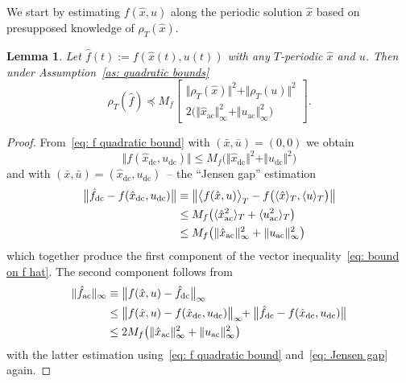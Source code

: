 \documentclass[letterpaper, 10 pt, conference]{ieeeconf}
\newcommand{\mmax}{_\mathrm{max}}
\newcommand{\ac}{_\mathrm{ac}}
\newcommand{\dc}{_\mathrm{dc}}
\newcommand{\pb}[1]{\big( #1 \big)}
\newcommand{\norm}[1]{\Vert #1 \Vert}
\newcommand{\normb}[1]{\big\Vert #1 \big\Vert}
\newcommand{\mean}[1]{\langle #1 \rangle}
\newcommand{\meanb}[1]{\big\langle #1 \big\rangle}
\newtheorem{remark}{Remark}
\newtheorem{lemma}{Lemma}
\begin{document}

We start by estimating $f(\hat x, u)$ along the periodic solution $\hat x$ based on presupposed knowledge of $\rho_T(\hat x)$.

\begin{lemma}
    \label{le: bound on f hat}
    Let $\hat f(t) := f(\hat x(t), u(t))$ with any $T$-periodic $\hat x$ and $u$. Then under Assumption~\ref{as: quadratic bounds}
    \begin{equation}
        \label{eq: bound on f hat}
        \rho_T(\hat f) \preceq M_f
        \begin{bmatrix}
            \norm{\rho_T(\hat x)}^2 + \norm{\rho_T(u)}^2 \\
            2\pb{\norm{\hat x\ac}_\infty^2 + \norm{u\ac}_\infty^2}
        \end{bmatrix}.
    \end{equation}
\end{lemma}

\vspace{2mm}
\begin{proof}
    From~\eqref{eq: f quadratic bound} with $(\bar x, \bar u) = (0, 0)$ we obtain
    \begin{equation}
        \normb{f(\hat x\dc, u\dc)} \leq M_f\pb{\norm{\hat x\dc}^2 + \norm{u\dc}^2}
    \end{equation}
    and with $(\bar x, \bar u) = (\hat x\dc, u\dc)$~-- the ``Jensen gap'' estimation
    \begin{align}
        \label{eq: Jensen gap}
        \normb{\hat f\dc - f(\hat x\dc, u\dc)}
        &\equiv \normb{\meanb{f(\hat x, u)}_T - f\pb{\mean{\hat x}_T, \mean{u}_T}} \notag \\
        &\leq M_f\pb{\mean{\hat x\ac^2}_T + \mean{u\ac^2}_T} \notag \\
        &\leq M_f\pb{\norm{\hat x\ac}_\infty^2 + \norm{u\ac}_\infty^2}
    \end{align}
    which together produce the first component of the vector inequality~\eqref{eq: bound on f hat}. The second component follows from
    \begin{align}
        \norm{\hat f\ac}_\infty
        &\equiv \normb{f(\hat x, u) - \hat f\dc}_\infty \notag \\
        &\leq \normb{f(\hat x, u) - f(\hat x\dc, u\dc)}_\infty \!\!+ \normb{\hat f\dc - f(\hat x\dc, u\dc)} \notag \\
        &\leq 2M_f\pb{\norm{\hat x\ac}_\infty^2 + \norm{u\ac}_\infty^2}
    \end{align}
    with the latter estimation using~\eqref{eq: f quadratic bound} and~\eqref{eq: Jensen gap} again.
\end{proof}
\end{document}
